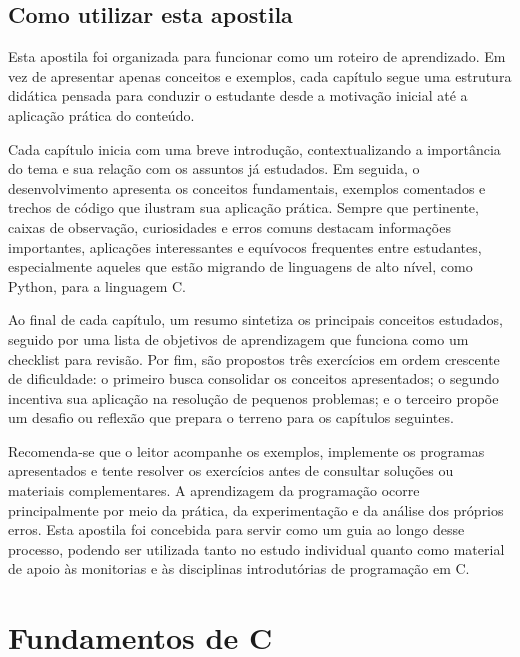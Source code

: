 \documentclass[12pt,a4paper,oneside]{extreport}
\begin{document}
\chapter*{Como utilizar esta apostila}

Esta apostila foi organizada para funcionar como um roteiro de aprendizado. Em vez de apresentar apenas conceitos e exemplos, cada capítulo segue uma estrutura didática pensada para conduzir o estudante desde a motivação inicial até a aplicação prática do conteúdo.

Cada capítulo inicia com uma breve introdução, contextualizando a importância do tema e sua relação com os assuntos já estudados. Em seguida, o desenvolvimento apresenta os conceitos fundamentais, exemplos comentados e trechos de código que ilustram sua aplicação prática. Sempre que pertinente, caixas de observação, curiosidades e erros comuns destacam informações importantes, aplicações interessantes e equívocos frequentes entre estudantes, especialmente aqueles que estão migrando de linguagens de alto nível, como Python, para a linguagem C.

Ao final de cada capítulo, um resumo sintetiza os principais conceitos estudados, seguido por uma lista de objetivos de aprendizagem que funciona como um checklist para revisão. Por fim, são propostos três exercícios em ordem crescente de dificuldade: o primeiro busca consolidar os conceitos apresentados; o segundo incentiva sua aplicação na resolução de pequenos problemas; e o terceiro propõe um desafio ou reflexão que prepara o terreno para os capítulos seguintes.

Recomenda-se que o leitor acompanhe os exemplos, implemente os programas apresentados e tente resolver os exercícios antes de consultar soluções ou materiais complementares. A aprendizagem da programação ocorre principalmente por meio da prática, da experimentação e da análise dos próprios erros. Esta apostila foi concebida para servir como um guia ao longo desse processo, podendo ser utilizada tanto no estudo individual quanto como material de apoio às monitorias e às disciplinas introdutórias de programação em C.



\tableofcontents
\newpage



\part{Fundamentos de C}
\end{document}
